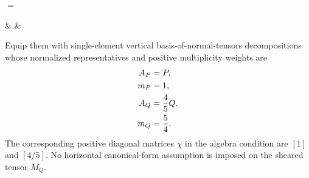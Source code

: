 \begin{definition}
\begin{tenkzequation}
\begin{tenkz}[boundary=open, cols=1]
        \end{tenkz}
        $ = $
        \begin{tenkz}[boundary=open]
             &
             &
        \end{tenkz}
    \end{tenkzequation}
    Equip them with single-element vertical
    basis-of-normal-tensors decompositions whose normalized representatives and positive
    multiplicity weights are
    \begin{align}
        A_P & =P,
        \notag           \\
        m_P & =1,
        \notag           \\
        A_Q & =\frac45Q,
        \notag           \\
        m_Q & =\frac54.
        \notag
    \end{align}
    The corresponding positive diagonal matrices $\chi$ in the algebra condition are
    $[1]$ and $[4/5]$. No horizontal canonical-form assumption is imposed
    on the sheared tensor $M_Q$.
\end{definition}


